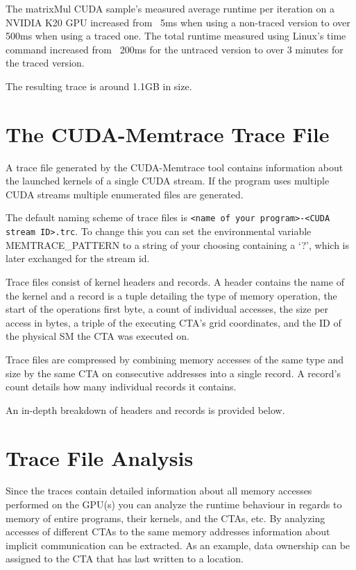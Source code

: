 \documentclass{scrartcl}
\begin{document}
The matrixMul CUDA sample’s measured average runtime per iteration on a NVIDIA K20 GPU increased from ~5ms when using a non-traced version to over 500ms when using a traced one.
The total runtime measured using Linux’s time command increased from ~200ms for the untraced version to over 3 minutes for the traced version.

The resulting trace is around 1.1GB in size.






\section{The CUDA-Memtrace Trace File}
A trace file generated by the CUDA-Memtrace tool contains information about the launched kernels of a single CUDA stream. If the program uses multiple CUDA streams multiple enumerated files are generated.

The default naming scheme of trace files is \lstinline{<name of your program>-<CUDA stream ID>.trc}. To change this you can set the environmental variable MEMTRACE\_PATTERN to a string of your choosing containing a ‘?’, which is later exchanged for the stream id.

Trace files consist of kernel headers and records. A header contains the name of the kernel and a record is a tuple detailing the type of memory operation, the start of the operations first byte, a count of individual accesses, the size per access in bytes, a triple of the executing CTA’s grid coordinates, and the ID of the physical SM the CTA was executed on.

Trace files are compressed by combining memory accesses of the same type and size by the same CTA on consecutive addresses into a single record. A record’s count details how many individual records it contains.

An in-depth breakdown of headers and records is provided below.


\section{Trace File Analysis}
Since the traces contain detailed information about all memory accesses performed on the GPU(s) you can analyze the runtime behaviour in regards to memory of entire programs, their kernels, and the CTAs, etc.
By analyzing accesses of different CTAs to the same memory addresses information about implicit communication can be extracted. As an example, data ownership can be assigned to the CTA that has last written to a location.
\end{document}
